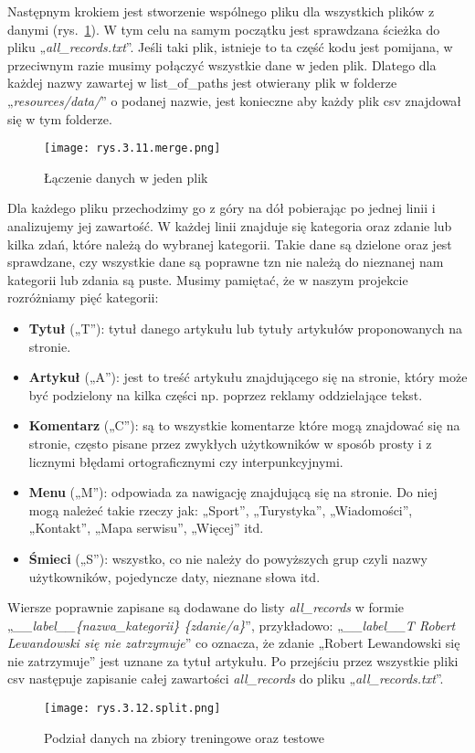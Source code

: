 Następnym krokiem jest stworzenie wspólnego pliku dla wszystkich plików z danymi (rys.~\ref{fig:3.11}). W tym celu na samym początku jest sprawdzana ścieżka do pliku „\emph{all\_records.txt}”. Jeśli taki plik, istnieje to ta część kodu jest pomijana, w przeciwnym razie musimy połączyć wszystkie dane w jeden plik. Dlatego dla każdej nazwy zawartej w list\_of\_paths jest otwierany plik w folderze „\emph{resources/data/}” o podanej nazwie, jest konieczne aby każdy plik csv znajdował się w tym folderze.
\begin{figure}[h]
    \centering
    \texttt{[image: rys.3.11.merge.png]}
    \caption{Łączenie danych w jeden plik}
    \label{fig:3.11}
\end{figure}
Dla każdego pliku przechodzimy go z góry na dół pobierając po jednej linii i analizujemy jej zawartość. W każdej linii znajduje się kategoria oraz zdanie lub kilka zdań, które należą do wybranej kategorii. Takie dane są dzielone oraz jest sprawdzane, czy wszystkie dane są poprawne tzn nie należą do nieznanej nam kategorii lub zdania są puste. Musimy pamiętać, że w naszym projekcie rozróżniamy pięć kategorii:
\begin{itemize}[label=\textbullet]
\item \textbf{Tytuł} („T”): tytuł danego artykułu lub tytuły artykułów proponowanych na stronie.
\item \textbf{Artykuł} („A”): jest to treść artykułu znajdującego się na stronie, który może być podzielony na kilka części np. poprzez reklamy oddzielające tekst.
\item \textbf{Komentarz} („C”): są to wszystkie komentarze które mogą znajdować się na stronie, często pisane przez zwykłych użytkowników w sposób prosty i z licznymi błędami ortograficznymi czy interpunkcyjnymi.
\item \textbf{Menu} („M”): odpowiada za nawigację znajdującą się na stronie. Do niej mogą należeć takie rzeczy jak: „Sport”, „Turystyka”, „Wiadomości”, „Kontakt”, „Mapa serwisu”, „Więcej” itd.
\item \textbf{Śmieci} („S”): wszystko, co nie należy do powyższych grup czyli nazwy użytkowników, pojedyncze daty, nieznane słowa itd.
\end{itemize}
Wiersze poprawnie zapisane są dodawane do listy \emph{all\_records} w formie „\emph{\_\_label\_\_\{nazwa\_kategorii\} \{zdanie/a\}}”, przykładowo: „\emph{\_\_label\_\_T Robert Lewandowski się nie zatrzymuje}” co oznacza, że zdanie „Robert Lewandowski się nie zatrzymuje” jest uznane za tytuł artykułu. 
Po przejściu przez wszystkie pliki csv następuje zapisanie całej zawartości \emph{all\_records} do pliku „\emph{all\_records.txt}”.
\begin{figure}[h]
    \centering
    \texttt{[image: rys.3.12.split.png]}
    \caption{Podział danych na zbiory treningowe oraz testowe}
    \label{fig:3.12}
\end{figure}

